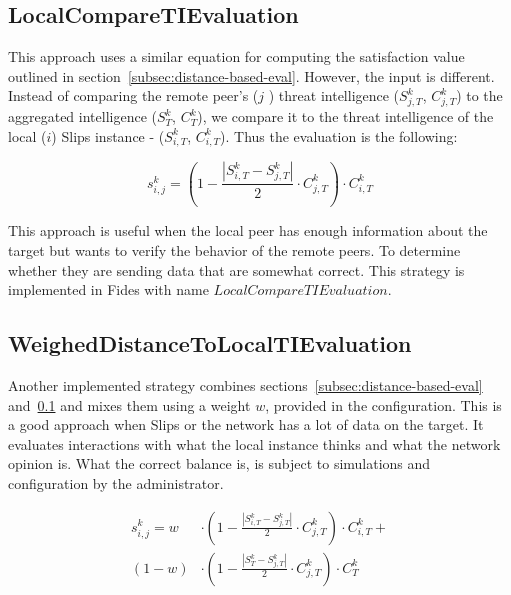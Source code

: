 \subsection{LocalCompareTIEvaluation}
\label{subsec:use-local-threat-to-evaluate}
This approach uses a similar equation for computing the satisfaction value outlined in section~\ref{subsec:distance-based-eval}. However, the input is different. Instead of comparing the remote peer's ($j$ ) threat intelligence ($S^{k}_{j, T}$, $C^{k}_{j, T}$) to the aggregated intelligence ($S^{k}_{T}$, $C^{k}_{T}$), we compare it to the threat intelligence of the local ($i$) Slips instance - ($S^{k}_{i, T}$, $C^{k}_{i, T}$). Thus the evaluation is the following:

\begin{equation}
s^{k}_{i, j} = \left(1 - \frac{|{S}^{k}_{i, T} - S^{k}_{j, T}|}{2} \cdot C^{k}_{j, T}\right) \cdot C^{k}_{i, T}
\end{equation}

This approach is useful when the local peer has enough information about the target but wants to verify the behavior of the remote peers.
To determine whether they are sending data that are somewhat correct. This strategy is implemented in Fides with name $LocalCompareTIEvaluation$.

\subsection{WeighedDistanceToLocalTIEvaluation}
\label{subsec:weigh-local-opinion-with-aggregated-one}
Another implemented strategy combines sections~\ref{subsec:distance-based-eval} and~\ref{subsec:use-local-threat-to-evaluate} and mixes them using a weight $w$, provided in the configuration.
This is a good approach when Slips or the network has a lot of data on the target. It evaluates interactions with what the local instance thinks and what the network opinion is.
What the correct balance is, is subject to simulations and configuration by the administrator.

\begin{equation}
\begin{split}
    s^{k}_{i, j} = w &\cdot \left(1 - \frac{|{S}^{k}_{i, T} - S^{k}_{j, T}|}{2} \cdot C^{k}_{j, T}\right) \cdot C^{k}_{i, T} + \\
    (1-w) &\cdot \left(1 - \frac{|{S}^{k}_{T} - S^{k}_{j, T}|}{2} \cdot C^{k}_{j, T}\right) \cdot C^{k}_{T}
\end{split}
\end{equation}

